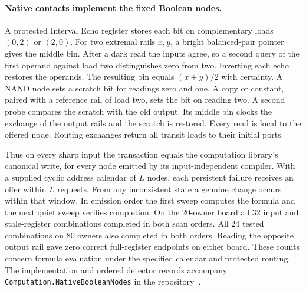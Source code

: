 \documentclass[11pt]{article}
\theoremstyle{remark}
\theoremstyle{plain}
\begin{document}
\paragraph{Native contacts implement the fixed Boolean nodes.}
A protected Interval Echo register stores each bit on complementary loads
$(0,2)$ or $(2,0)$. For two extremal rails $x,y$, a bright balanced-pair
pointer gives the middle bin. After a dark read the inputs agree, so a
second query of the first operand against load two distinguishes zero from
two. Inverting each echo restores the operands. The resulting bin equals
$(x+y)/2$ with certainty. A NAND node sets a scratch bit for readings zero
and one. A copy or constant, paired with a reference rail of load two,
sets the bit on reading two. A second probe compares the scratch with
the old output. Its middle bin clocks the exchange of the output rails
and the scratch is restored. Every read is local to the offered node.
Routing exchanges return all transit loads to their initial ports.

Thus on every sharp input the transaction equals the computation library's
canonical write, for every node emitted by its input-independent compiler.
With a supplied cyclic address calendar of $L$ nodes, each persistent
failure receives an offer within $L$ requests. From any inconsistent
state a genuine change occurs within that window. In emission order
the first sweep computes the formula and the next quiet sweep verifies
completion. On the 20-owner board all 32 input and stale-register
combinations completed in both scan orders. All 24 tested combinations on
80 owners also completed in both orders. Reading the opposite output rail
gave zero correct full-register endpoints on either board. These counts
concern formula evaluation under the specified calendar and protected
routing. The implementation and ordered detector records accompany
\texttt{Computation.NativeBooleanNodes} in the repository~\cite{ophrepo}.
\end{document}
